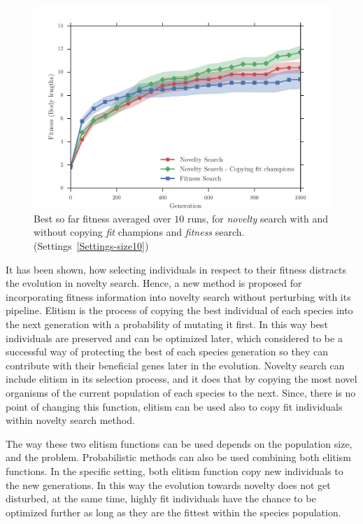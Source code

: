 \begin{figure}[t!]
\centering
\includegraphics[width=1.0\textwidth]{../Figures/Results/CopyFitChampions10.pdf}
\caption{Best so far fitness averaged over $10$ runs, for \emph{novelty} search with and without copying \emph{fit} champions and \emph{fitness} search. (Settings~\ref{Settings-size10})}
\label{fig:CopyFitChampions10}
\end{figure}

It has been shown, how selecting individuals in respect to their fitness distracts the evolution in novelty search. Hence, a new method is proposed for incorporating fitness information into novelty search without perturbing with its pipeline. Elitism is the process of copying the best individual of each species into the next generation with a probability of mutating it first. In this way best individuals are preserved and can be optimized later, which considered to be a successful way of protecting the best of each species generation so they can contribute with their beneficial genes later in the evolution. Novelty search can include elitism in its selection process, and it does that by copying the most novel organisms of the current population of each species to the next. Since, there is no point of changing this function, elitism can be used also to copy fit individuals within novelty search method. 

The way these two elitism functions can be used depends on the population size, and the problem. Probabilistic methods can also be used combining both elitism functions. In the specific setting, both elitism function copy new individuals to the new generations. In this way the evolution towards novelty does not get disturbed, at the same time, highly fit individuals have the chance to be optimized further as long as they are the fittest within the species population.

